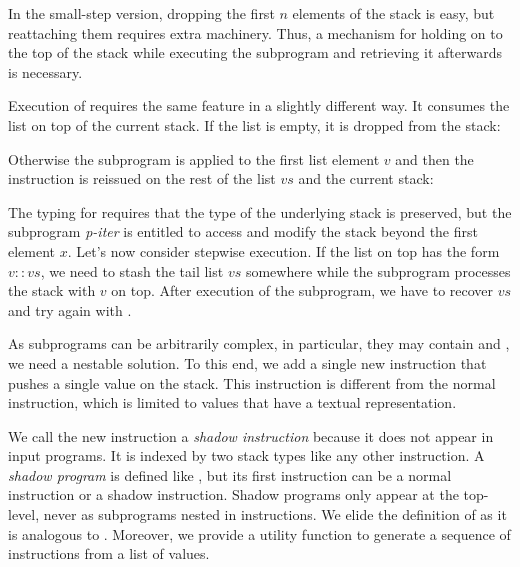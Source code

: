In the small-step version, dropping the first $n$ elements of the
stack is easy, but reattaching them requires extra machinery.
Thus, a mechanism for holding on to the top of the stack while executing the subprogram
and retrieving it afterwards is necessary.

Execution of  requires the same feature in a slightly different way.
It consumes the list on top of the current stack.
If the list is empty, it is dropped from the stack:
%
\BigstepIterNil

Otherwise the subprogram is applied to the first list element $v$ and then
the  instruction is reissued on the rest of the list $vs$
and the current stack:
\BigstepIterCons

The typing for  requires that the type of the underlying
stack is preserved, but the subprogram \textit{p-iter} is 
entitled to access and modify the stack beyond the first element $x$.
Let's now consider stepwise execution. If the list on top has the form $v
:: vs$,  we need to stash the tail list $vs$ somewhere while the subprogram
processes the stack with $v$ on top.
After execution of the subprogram,
we have to recover $vs$ and try again with .

As subprograms can be arbitrarily complex, in particular, they
may contain  and , we need a nestable solution.
To this end, we add a single new instruction  that pushes
a single value on the stack. This instruction is
different from the normal  instruction, which is limited to
 values that have a textual representation.
\ConcreteShadowInst

We call the new instruction a \emph{shadow instruction} because it does not
appear in input programs. It is indexed by two stack types like
any other instruction.
A \emph{shadow program} is defined like , but its first
instruction can be a normal instruction or a shadow instruction. Shadow programs only appear
at the top-level, never as subprograms nested in instructions. We elide the definition of
 as it is analogous to . Moreover, we
provide a utility function  to generate a sequence of
 instructions from a list of values.
\ConcreteMpush


